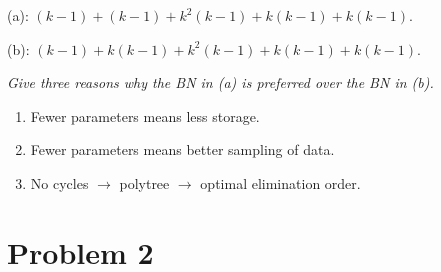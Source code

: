 \documentclass{article}
\begin{document}
\begin{enumerate}[(a)]
  (a): $(k-1)+(k-1)+k^2(k-1)+k(k-1)+k(k-1)$.

  (b): $(k-1)+k(k-1)+k^2(k-1)+k(k-1)+k(k-1)$.

  \textit{Give three reasons why the BN in (a) is preferred over the
    BN in (b).}

  \begin{enumerate}
  \item Fewer parameters means less storage.
  \item Fewer parameters means better sampling of data.
  \item No cycles $\rightarrow$ polytree $\rightarrow$ optimal
    elimination order.
  \end{enumerate}

\end{enumerate}

\section{Problem 2}
\end{document}
